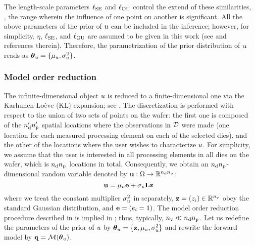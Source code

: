 The length-scale parameters $\ell_{\text{SE}}$ and $\ell_{\text{OU}}$ control the extend of these similarities, \ie, the range wherein the influence of one point on another is significant. All the above parameters of the prior of $u$ can be included in the inference; however, for simplicity, $\eta$, $\ell_{\text{SE}}$, and $\ell_{\text{OU}}$ are assumed to be given in this work (see \cite{marzouk2009} and references therein). Therefore, the parametrization of the prior distribution of $u$ reads as ${\boldsymbol\theta}_u = \{ \mu_u, \sigma_u^2 \}$.

\subsubsection{Model order reduction} 
The infinite-dimensional object $u$ is reduced to a finite-dimensional one via the Karhunen-Lo\`{e}ve (KL) expansion; see . The discretization is performed with respect to the union of two sets of points on the wafer: the first one is composed of the ${n_\text{d}'} {n_\text{p}'}$ spatial locations where the observations in $\mathcal{D}$ were made (one location for each measured processing element on each of the selected dies), and the other of the locations where the user wishes to characterize $u$. For simplicity, we assume that the user is interested in all processing elements in all dies on the wafer, which is ${n_\text{d}} {n_\text{p}}$ locations in total. Consequently, we obtain an ${n_\text{d}} {n_\text{p}}$-dimensional random variable denoted by $\mathbf{u}: \Omega \to \mathbb{R}^{{n_\text{d}} {n_\text{p}}}$:
\begin{equation} \elabel{kl-approximation}
  \vu = \mu_\u \vI + \sigma_\u \mKL \vz
\end{equation}
where we treat the constant multiplier $\sigma^2_u$ in  separately, $\mathbf{z} = (z_i) \in \mathbb{R}^{n_\text{v}}$ obey the standard Gaussian distribution, and $\mathbf{e} = (e_i = 1)$. The model order reduction procedure described in  is implied in ; thus, typically, ${n_\text{v}} \ll {n_\text{d}} {n_\text{p}}$. Let us redefine the parameters of the prior of $u$ by ${\boldsymbol\theta}_u = \{ \mathbf{z}, \mu_u, \sigma^2_u \}$ and rewrite the forward model by $\mvT = \model{\vparam_\u}$.

